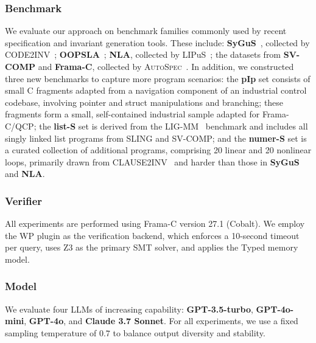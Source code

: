 \documentclass[lettersize,journal]{IEEEtran}
\newcommand{\autospec}{\textsc{AutoSpec}}
\begin{document}
\subsubsection*{Benchmark}
We evaluate our approach on benchmark families commonly used by recent specification and invariant generation tools. These include:  \textbf{SyGuS}~\cite{alur2019sygus}, collected by CODE2INV~\cite{Code2Inv_a_Deep_Learning_Framework_for_Program_Verification}; \textbf{OOPSLA}~\cite{Inductive_Invariant_Generation_via_Abductive_Inference}; \textbf{NLA}, collected by LIPuS~\cite{Loop_Invariant_Inference_through_SMT_Solving_Enhanced_Reinforcement_Learning}; the datasets from \textbf{SV-COMP} and \textbf{Frama-C}, collected by \autospec~\cite{autospec}.
In addition, we constructed three new benchmarks to capture more program scenarios: the \textbf{pIp} set consists of small C fragments adapted from a navigation component of an industrial control codebase, involving pointer and struct manipulations and branching; {these fragments form a small, self-contained industrial sample adapted for Frama-C/QCP};
the \textbf{list-S} set is derived from the LIG-MM~\cite{LIG-MM} benchmark and includes all singly linked list programs from SLING and SV-COMP; and the \textbf{numer-S} set is a curated collection of additional programs, comprising 20 linear and 20 nonlinear loops, primarily drawn from CLAUSE2INV~\cite{DBLP:journals/pacmse/CaoWXYWCM25} and harder than those in \textbf{SyGuS} and \textbf{NLA}.



\subsubsection*{Verifier}

All experiments are performed using Frama-C version 27.1 (Cobalt). We employ the WP plugin as the verification backend, which enforces a 10-second timeout per query, uses Z3 as the primary SMT solver, and applies the Typed memory model.  

\subsubsection*{Model}
We evaluate four LLMs of increasing capability: \textbf{GPT-3.5-turbo}, \textbf{GPT-4o-mini}, \textbf{GPT-4o}, and \textbf{Claude 3.7 Sonnet}. For all experiments, we use a fixed sampling temperature of $0.7$ to balance output diversity and stability.
\end{document}
